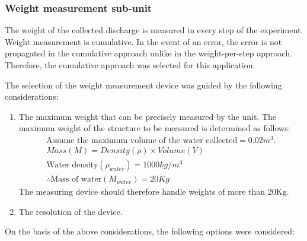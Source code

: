 \subsubsection{Weight measurement sub-unit}
The weight of the collected discharge is measured in every step of the experiment. Weight measurement is cumulative. In the event of an error, the error is not propagated in the cumulative approach unlike in the weight-per-step approach. Therefore, the cumulative approach was selected for this application.
\par
The selection of the weight measurement device was guided by the following considerations:
\begin{enumerate}
    \item The maximum weight that can be precisely measured by the unit. The maximum weight of the structure to be measured is determined as follows:\\
    \begin{align*}
    \text{Assume the maximum volume of the water collected} = 0.02m^{3}.\\
    Mass(M) = Density(\rho) \times Volume(V)\\
    \text{Water density} (\rho_{\textit{water}}) = 1000kg/m^{3}\\
    \therefore  \text{Mass of water} (M_{\textit{water}}) = 20 Kg
    \end{align*}
    The measuring device should therefore handle weights of more than 20Kg.
    \item The resolution of the device.
\end{enumerate}
On the basis of the above considerations, the following options were considered:
